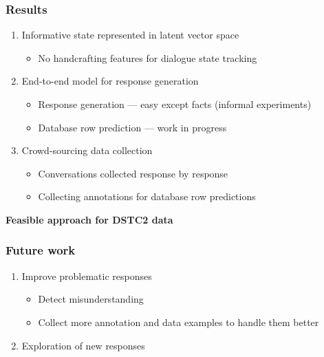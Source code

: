 \documentclass[10pt, compress,british,xcolor={svgnames,dvipsnames,x11names},trans]{beamer}
\begin{document}
\begin{frame}\frametitle{Results}
    \begin{enumerate}
        \item Informative state represented in latent vector space
        \begin{itemize}
            \item No handcrafting features for dialogue state tracking~\cite{platek_recurrent_2016}
        \end{itemize}
        \item End-to-end model for response generation
            \begin{itemize}
            \item Response generation --- easy except facts (informal experiments)
            \item Database row prediction --- work in progress
            \end{itemize}
        \item Crowd-sourcing data collection~\cite{platek2016wochat}
            \begin{itemize}
                \item Conversations collected response by response
                \item Collecting annotations for database row predictions
            \end{itemize}
    \end{enumerate}
    {\bf \color{darkgreen} Feasible approach for DSTC2 data}
\end{frame}

\begin{frame}\frametitle{Future work}
    \begin{enumerate}
        \item Improve problematic responses
            \begin{itemize}
                \item Detect misunderstanding
                \item Collect more annotation and data examples to handle them better
            \end{itemize}
        \item Exploration of new responses 
    \end{enumerate}
\end{frame}



\end{document}
